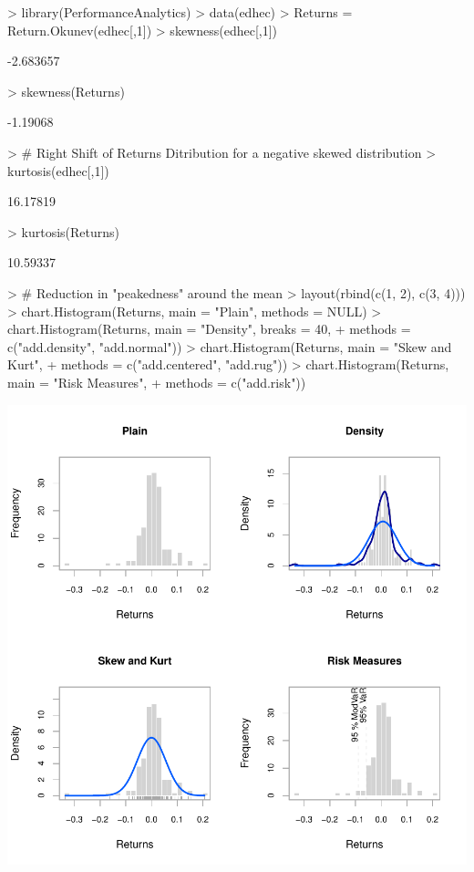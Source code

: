 \documentclass[12pt,letterpaper,english]{article}
\begin{document}
\begin{Schunk}
\begin{Sinput}
> library(PerformanceAnalytics)
> data(edhec)
> Returns = Return.Okunev(edhec[,1])
> skewness(edhec[,1])
\end{Sinput}
\begin{Soutput}
[1] -2.683657
\end{Soutput}
\begin{Sinput}
> skewness(Returns)
\end{Sinput}
\begin{Soutput}
[1] -1.19068
\end{Soutput}
\begin{Sinput}
> # Right Shift of Returns Ditribution for a negative skewed distribution 
> kurtosis(edhec[,1])
\end{Sinput}
\begin{Soutput}
[1] 16.17819
\end{Soutput}
\begin{Sinput}
> kurtosis(Returns)
\end{Sinput}
\begin{Soutput}
[1] 10.59337
\end{Soutput}
\begin{Sinput}
> # Reduction in "peakedness" around the mean
> layout(rbind(c(1, 2), c(3, 4)))
>  chart.Histogram(Returns, main = "Plain", methods = NULL)
>  chart.Histogram(Returns, main = "Density", breaks = 40,
+  methods = c("add.density", "add.normal"))
>  chart.Histogram(Returns, main = "Skew and Kurt",
+  methods = c("add.centered", "add.rug"))
> chart.Histogram(Returns, main = "Risk Measures",
+  methods = c("add.risk"))
\end{Sinput}
\end{Schunk}
\includegraphics{OkunevWhite-Graph10}
\end{document}
